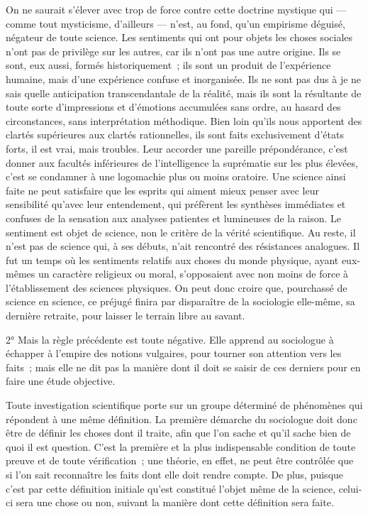 \documentclass[french,twoside]{book} %
\begin{document}
On ne saurait s’élever avec trop de force contre cette doctrine mystique qui — comme tout mysticisme, d’ailleurs — n’est, au fond, qu’un empirisme déguisé, négateur de toute science. Les sentiments qui ont pour objets les choses sociales n’ont pas de privilège sur les autres, car ils n’ont pas une autre origine. Ils se sont, eux aussi, formés historiquement ; ils sont un produit de l’expérience humaine, mais d’une expérience confuse et inorganisée. Ils ne sont pas dus à je ne sais quelle anticipation transcendantale de la réalité, mais ils sont la résultante de toute sorte d’impressions et d’émotions accumulées sans ordre, au hasard des circonstances, sans interprétation méthodique. Bien loin qu’ils nous apportent des clartés supérieures aux clartés rationnelles, ils sont faits exclusivement d’états forts, il est vrai, mais troubles. Leur accorder une pareille prépondérance, c’est donner aux facultés inférieures de l’intelligence la suprématie sur les plus élevées, c’est se condamner à une logomachie plus ou moins oratoire. Une science ainsi faite ne peut satisfaire que les esprits qui aiment mieux penser avec leur sensibilité qu’avec leur entendement, qui préfèrent les synthèses immédiates et confuses de la sensation aux analyses patientes et lumineuses de la raison. Le sentiment est objet de science, non le critère de la vérité scientifique. Au reste, il n’est pas de science qui, à ses débuts, n’ait rencontré des résistances analogues. Il fut un temps où les sentiments relatifs aux choses du monde physique, ayant eux-mêmes un caractère religieux ou moral, s’opposaient avec non moins de force à l’établissement des sciences physiques. On peut donc croire que, pourchassé de science en science, ce préjugé finira par disparaître de la sociologie elle-même, sa dernière retraite, pour laisser le terrain libre au savant.\par
\par
2° Mais la règle précédente est toute négative. Elle apprend au sociologue à échapper à l’empire des notions vulgaires, pour tourner son attention vers les faits ; mais elle ne dit pas la manière dont il doit se saisir de ces derniers pour en faire une étude objective.\par
Toute investigation scientifique porte sur un groupe déterminé de phénomènes qui répondent à une même définition. La première démarche du sociologue doit donc être de définir les choses dont il traite, afin que l’on sache et qu’il sache bien de quoi il est question. C’est la première et la plus indispensable condition de toute preuve et de toute vérification ; une théorie, en effet, ne peut être contrôlée que si l’on sait reconnaître les faits dont elle doit rendre compte. De plus, puisque c’est par cette définition initiale qu’est constitué l’objet même de la science, celui-ci sera une chose ou non, suivant la manière dont cette définition sera faite.\par
\end{document}
